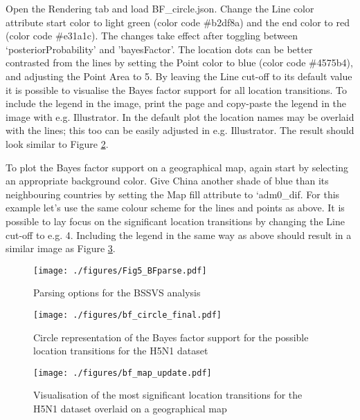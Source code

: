 \documentclass[english]{paper}
\begin{document}
Open the Rendering tab and load BF\_circle.json.
Change the Line color attribute start color to light green (color code \#b2df8a) and the end color to red (color code \#e31a1c).
The changes take effect after toggling between `posteriorProbability' and 'bayesFactor'.
The location dots can be better contrasted from the lines by setting the Point color to blue (color code \#4575b4), and adjusting the Point Area to 5. 
By leaving the Line cut-off to its default value it is possible to visualise the Bayes factor support for all location transitions.
To include the legend in the image, print the page and copy-paste the legend in the image with e.g. Illustrator. 
In the default plot the location names may be overlaid with the lines; this too can be easily adjusted in e.g. Illustrator.
The result should look similar to Figure \ref{fig:BFcircle}.
\par
To plot the Bayes factor support on a geographical map, again start by selecting an appropriate background color.
Give China another shade of blue than its neighbouring countries by setting the Map fill attribute to `adm0\_dif.
For this example let's use the same colour scheme for the lines and points as above. 
It is possible to lay focus on the significant location transitions by changing the Line cut-off to e.g. 4. 
Including the legend in the same way as above should result in a similar image as Figure \ref{fig:BFmap}.

\begin{figure}%
\centering
\texttt{[image: ./figures/Fig5\_BFparse.pdf]} %
\caption{Parsing options for the BSSVS analysis}
\label{fig:parseBF}
\end{figure}

\begin{figure}%
\centering
\texttt{[image: ./figures/bf\_circle\_final.pdf]} %
\caption{Circle representation of the Bayes factor support for the possible location transitions for the H5N1 dataset}
\label{fig:BFcircle}
\end{figure}

\begin{figure}%
\centering
\texttt{[image: ./figures/bf\_map\_update.pdf]} %
\caption{Visualisation of the most significant location transitions for the H5N1 dataset overlaid on a geographical map}
\label{fig:BFmap}
\end{figure}
\end{document}
